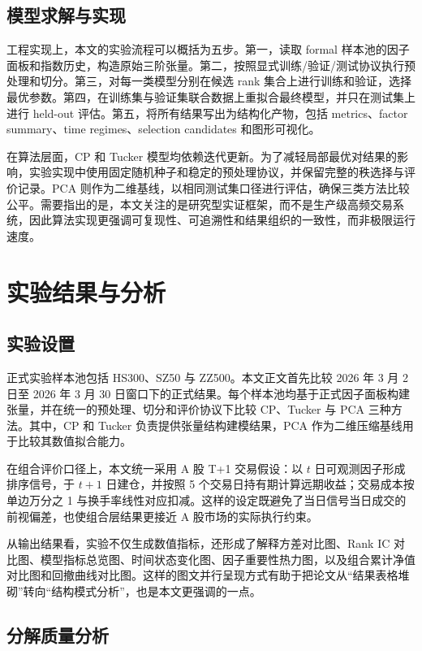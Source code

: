 \section{模型求解与实现}

工程实现上，本文的实验流程可以概括为五步。第一，读取 formal 样本池的因子面板和指数历史，构造原始三阶张量。第二，按照显式训练/验证/测试协议执行预处理和切分。第三，对每一类模型分别在候选 rank 集合上进行训练和验证，选择最优参数。第四，在训练集与验证集联合数据上重拟合最终模型，并只在测试集上进行 held-out 评估。第五，将所有结果写出为结构化产物，包括 metrics、factor summary、time regimes、selection candidates 和图形可视化。

在算法层面，CP 和 Tucker 模型均依赖迭代更新。为了减轻局部最优对结果的影响，实验实现中使用固定随机种子和稳定的预处理协议，并保留完整的秩选择与评价记录。PCA 则作为二维基线，以相同测试集口径进行评估，确保三类方法比较公平。需要指出的是，本文关注的是研究型实证框架，而不是生产级高频交易系统，因此算法实现更强调可复现性、可追溯性和结果组织的一致性，而非极限运行速度。

\chapter{实验结果与分析}

\section{实验设置}

正式实验样本池包括 HS300、SZ50 与 ZZ500。本文正文首先比较 2026 年 3 月 2 日至 2026 年 3 月 30 日窗口下的正式结果。每个样本池均基于正式因子面板构建张量，并在统一的预处理、切分和评价协议下比较 CP、Tucker 与 PCA 三种方法。其中，CP 和 Tucker 负责提供张量结构建模结果，PCA 作为二维压缩基线用于比较其数值拟合能力。

在组合评价口径上，本文统一采用 A 股 T+1 交易假设：以 $t$ 日可观测因子形成排序信号，于 $t+1$ 日建仓，并按照 5 个交易日持有期计算远期收益；交易成本按单边万分之 1 与换手率线性对应扣减。这样的设定既避免了当日信号当日成交的前视偏差，也使组合层结果更接近 A 股市场的实际执行约束。

从输出结果看，实验不仅生成数值指标，还形成了解释方差对比图、Rank IC 对比图、模型指标总览图、时间状态变化图、因子重要性热力图，以及组合累计净值对比图和回撤曲线对比图。这样的图文并行呈现方式有助于把论文从“结果表格堆砌”转向“结构模式分析”，也是本文更强调的一点。

\section{分解质量分析}

